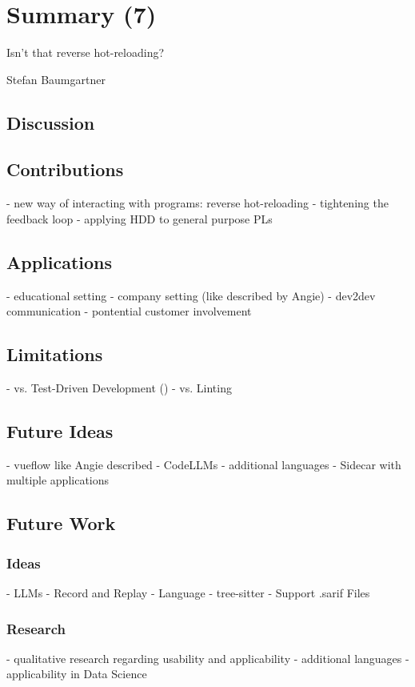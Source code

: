 \chapter{Summary (7)}
\epigraph{Isn't that reverse hot-reloading?}{Stefan Baumgartner}
\section{Discussion}
\section{Contributions}
- new way of interacting with programs: reverse hot-reloading
- tightening the feedback loop
- applying HDD to general purpose PLs
\section{Applications}
- educational setting
- company setting (like described by Angie)
- dev2dev communication
- pontential customer involvement
\section{Limitations}
- vs. Test-Driven Development ()
- vs. Linting
\section{Future Ideas}
- vueflow like Angie described
- CodeLLMs
- additional languages
- Sidecar with multiple applications
\section{Future Work}
\subsection{Ideas}
- LLMs
- Record and Replay
- Language
- tree-sitter
- Support .sarif Files
\subsection{Research}
- qualitative research regarding usability and applicability
- additional languages
- applicability in Data Science